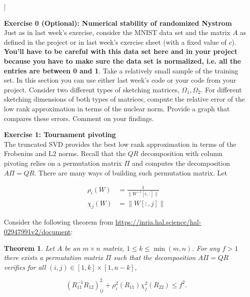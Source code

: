 \documentclass[11pt]{article}
\newtheorem{theorem}{Theorem}
\begin{document}
\lstset{frameround=fttt,language=Matlab}

\lstMakeShortInline[columns=fixed]|


{\bf{Exercise 0 (Optional): Numerical stability of randomized Nystrom}} \\

Just as in last week's exercise, consider the MNIST data set and the matrix $A$ as defined in the project or in last week's exercise sheet (with a fixed value of $c$). \textbf{You'll have to be careful with this data set here and in your project because you have to make sure the data set is normalized, i.e. all the entries are between 0 and 1}. Take a relatively small sample of the training set. In this section you can use either last week's code or your code from your project. Consider two different types of sketching matrices, $\Omega_1, \Omega_2$. For different sketching dimensions of both types of matrices, compute the relative error of the low rank approximation in terms of the nuclear norm. Provide a graph that compares these errors. Comment on your findings. 


\bigskip

{\bf{Exercise 1: Tournament pivoting}} \\

The truncated SVD provides the best low rank approximation in terms of the Frobenius and L2 norms. Recall that the $QR$ decomposition with column pivoting relies on a permutation matrix $\Pi$ and computes the decomposition $A \Pi = QR$. There are many ways of building such permutation matrix. Let 

\begin{align*}
\rho_i(W) &= \frac{1}{\|W^{-1}[i, :]\| } \\
\chi_j(W) &= \|W[:, j]\|
\end{align*}

Consider the following theorem from \url{https://inria.hal.science/hal-02947991v2/document}:


\begin{theorem}
Let $A$ be an $m \times n$ matrix, $1 \leq k \leq \min(m, n)$. For any $f>1$ there exists a permutation matrix $\Pi$ such that the decomposition $A \Pi = QR$ verifies for all $(i, j) \in [1, k] \times [1, n-k]$, 

\[ (R_{11}^{-1}R_{12})_{ij}^2 + \rho_i^2(R_11)\chi_j^2(R_22) \leq f^2. \]

\end{theorem} 
\end{document}
